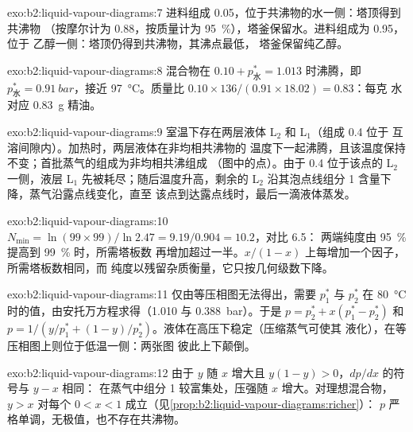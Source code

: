 \begin{solution}{exo:b2:liquid-vapour-diagrams:7}
进料组成 0.05，位于共沸物的水一侧：塔顶得到共沸物
（按摩尔计为 0.88，按质量计为 95~\%），塔釜保留水。进料组成为 0.95，位于
乙醇一侧：塔顶仍得到共沸物，其沸点最低，
塔釜保留纯乙醇。
\end{solution}

\begin{solution}{exo:b2:liquid-vapour-diagrams:8}
混合物在 $0.10 + p^*_{\text{水}} = 1.013$ 时沸腾，即
$p^*_{\text{水}} = \qty{0.91}{bar}$，接近 \qty{97}{\degreeCelsius}。质量比
$0.10 \times 136/(0.91 \times 18.02) = 0.83$：每克
水对应 \qty{0.83}{g} 精油。
\end{solution}

\begin{solution}{exo:b2:liquid-vapour-diagrams:9}
室温下存在两层液体 L$_2$ 和 L$_1$（组成 0.4 位于
互溶间隙内）。加热时，两层液体在非均相共沸物的
温度下一起沸腾，且该温度保持不变；首批蒸气的组成为非均相共沸组成
（图中的点）。由于 0.4 位于该点的 L$_2$ 一侧，液层
L$_1$ 先被耗尽；随后温度升高，剩余的 L$_2$
沿其泡点线组分 1 含量下降，蒸气沿露点线变化，直至
该点到达露点线时，最后一滴液体蒸发。
\end{solution}

\begin{solution}{exo:b2:liquid-vapour-diagrams:10}
$N_{\min} = \ln(99 \times 99)/\ln 2.47 = 9.19/0.904 = 10.2$，对比 6.5：
两端纯度由 95~\% 提高到 99~\% 时，所需塔板数
再增加超过一半。$x/(1 - x)$ 上每增加一个因子，所需塔板数相同，而
纯度以残留杂质衡量，它只按几何级数下降。
\end{solution}

\begin{solution}{exo:b2:liquid-vapour-diagrams:11}
仅由等压相图无法得出，需要 $p_1^*$ 与 $p_2^*$ 在
\qty{80}{\degreeCelsius} 时的值，由安托万方程求得（1.010 与
\qty{0.388}{bar}）。于是 $p = p_2^* + x(p_1^* - p_2^*)$ 和 $p = 1/(y/p_1^* + (1 -
y)/p_2^*)$。液体在高压下稳定（压缩蒸气可使其
液化），在等压相图上则位于低温一侧：两张图
彼此上下颠倒。
\end{solution}

\begin{solution}{exo:b2:liquid-vapour-diagrams:12}
由于 $y$ 随 $x$ 增大且 $y(1 - y) > 0$，$dp/dx$ 的符号与 $y - x$ 相同：
在蒸气中组分 1 较富集处，压强随 $x$ 增大。对理想混合物，
$y > x$ 对每个 $0 < x < 1$ 成立（见\cref{prop:b2:liquid-vapour-diagrams:richer}）：
$p$ 严格单调，无极值，也不存在共沸物。
\end{solution}

